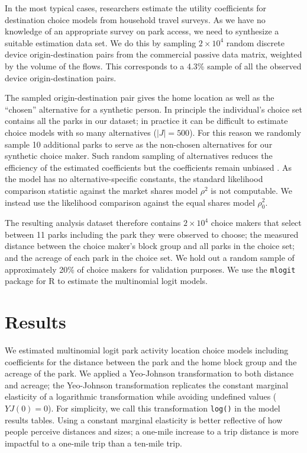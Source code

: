 \documentclass[]{elsarticle} %
\begin{document}
In the most typical cases, researchers estimate the utility coefficients for
destination choice models from household travel surveys. As we have no knowledge
of an appropriate survey on park access, we need to synthesize a suitable
estimation data set. We do this by sampling
\ensuremath{2\times 10^{4}} random discrete device origin-destination pairs from the commercial
passive data matrix, weighted by the volume of the flows. This corresponds to a
4.3\% sample of all the observed device
origin-destination pairs.

The sampled origin-destination pair gives the home location as well as the
``chosen'' alternative for a synthetic person. In principle the individual's
choice set contains all the parks in our dataset; in practice it can be
difficult to estimate choice models with so many alternatives
(\(|J| = 500\)). For this reason we randomly sample 10 additional parks
to serve as the non-chosen alternatives for our synthetic choice maker. Such
random sampling of alternatives reduces the efficiency of the estimated
coefficients but the coefficients remain unbiased \citep{train2009}. As the model has
no alternative-specific constants, the standard likelihood comparison statistic
against the market shares model \(\rho^2\) is not computable. We instead use the
likelihood comparison against the equal shares model \(\rho_0^2\).

The resulting analysis dataset therefore contains \ensuremath{2\times 10^{4}} choice makers that
select between 11 parks including the park they were observed to
choose; the measured distance between the choice maker's block group and all
parks in the choice set; and the acreage of each park in the choice set. We hold
out a random sample of approximately 20\% of choice makers for validation
purposes. We use the \texttt{mlogit} package for R \citep{mlogit, R} to estimate the
multinomial logit models.

\hypertarget{results}{%
\section{Results}\label{results}}

We estimated multinomial logit park activity location choice models including
coefficients for the distance between the park and the home block group and the
acreage of the park. We applied a Yeo-Johnson transformation \citep{Yeo2000} to both
distance and acreage; the Yeo-Johnson transformation replicates the constant
marginal elasticity of a logarithmic transformation while avoiding undefined
values (\(YJ(0) = 0\)). For simplicity, we call this transformation \texttt{log()} in the
model results tables. Using a constant marginal elasticity is better reflective
of how people perceive distances and sizes; a one-mile increase to a trip
distance is more impactful to a one-mile trip than a ten-mile trip.
\end{document}
